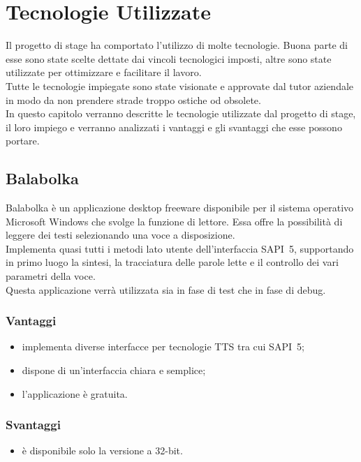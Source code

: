 \chapter{Tecnologie Utilizzate} %
Il progetto di stage ha comportato l'utilizzo di molte tecnologie. Buona parte di esse sono state scelte dettate dai vincoli tecnologici imposti, altre sono state utilizzate per ottimizzare e facilitare il lavoro.\\
Tutte le tecnologie impiegate sono state visionate e approvate dal tutor aziendale in modo da non prendere strade troppo ostiche od obsolete.\\
In questo capitolo verranno descritte le tecnologie utilizzate dal progetto di stage, il loro impiego e verranno analizzati i vantaggi e gli svantaggi che esse possono portare. 
\thispagestyle{empty}

\newpage
\section{Balabolka}
Balabolka è un applicazione desktop freeware disponibile per il sistema operativo Microsoft Windows che svolge la funzione di lettore. Essa offre la possibilità di leggere dei testi selezionando una voce a disposizione.\\
Implementa quasi tutti i metodi lato utente dell'interfaccia SAPI~5, supportando in primo luogo la sintesi, la tracciatura delle parole lette e il controllo dei vari parametri della voce.\\
Questa applicazione verrà utilizzata sia in fase di test che in fase di debug.
\subsection*{Vantaggi}
\begin{itemize}
	\item implementa diverse interfacce per tecnologie TTS tra cui SAPI~5;
	\item dispone di un'interfaccia chiara e semplice;
	\item l'applicazione è gratuita.
\end{itemize}
\subsection*{Svantaggi}
\begin{itemize}
	\item è disponibile solo la versione a 32-bit.
\end{itemize}

